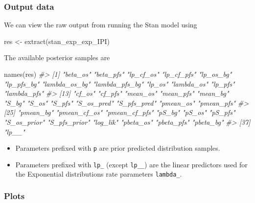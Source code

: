 \documentclass[
]{article}
\newenvironment{Shaded}{\begin{snugshade}}{\end{snugshade}}
\newcommand{\CommentTok}[1]{\textcolor[rgb]{0.56,0.35,0.01}{\textit{#1}}}
\newcommand{\FunctionTok}[1]{\textcolor[rgb]{0.00,0.00,0.00}{#1}}
\newcommand{\NormalTok}[1]{#1}
\newcommand{\OtherTok}[1]{\textcolor[rgb]{0.56,0.35,0.01}{#1}}
\providecommand{\tightlist}{%
  \setlength{\itemsep}{0pt}\setlength{\parskip}{0pt}}
\begin{document}
\hypertarget{output-data}{%
\subsubsection{Output data}\label{output-data}}

We can view the raw output from running the Stan model using

\begin{Shaded}
\begin{Highlighting}[]
\NormalTok{res }\OtherTok{\textless{}{-}} \FunctionTok{extract}\NormalTok{(stan\_exp\_exp\_IPI)}
\end{Highlighting}
\end{Shaded}

The available posterior samples are

\begin{Shaded}
\begin{Highlighting}[]
\FunctionTok{names}\NormalTok{(res)}
\CommentTok{\#\textgreater{}  [1] "beta\_os"       "beta\_pfs"      "lp\_cf\_os"      "lp\_cf\_pfs"     "lp\_os\_bg"      "lp\_pfs\_bg"     "lambda\_os\_bg"  "lambda\_pfs\_bg" "lp\_os"         "lambda\_os"     "lp\_pfs"        "lambda\_pfs"   }
\CommentTok{\#\textgreater{} [13] "cf\_os"         "cf\_pfs"        "mean\_os"       "mean\_pfs"      "mean\_bg"       "S\_bg"          "S\_os"          "S\_pfs"         "S\_os\_pred"     "S\_pfs\_pred"    "pmean\_os"      "pmean\_pfs"    }
\CommentTok{\#\textgreater{} [25] "pmean\_bg"      "pmean\_cf\_os"   "pmean\_cf\_pfs"  "pS\_bg"         "pS\_os"         "pS\_pfs"        "S\_os\_prior"    "S\_pfs\_prior"   "log\_lik"       "pbeta\_os"      "pbeta\_pfs"     "pbeta\_bg"     }
\CommentTok{\#\textgreater{} [37] "lp\_\_"}
\end{Highlighting}
\end{Shaded}

\begin{itemize}
\tightlist
\item
  Parameters prefixed with \texttt{p} are prior predicted distribution
  samples.
\item
  Parameters prefixed with \texttt{lp\_} (except \texttt{lp\_\_}) are
  the linear predictors used for the Exponential distributions rate
  parameters \texttt{lambda\_}.
\end{itemize}

\hypertarget{plots}{%
\subsubsection{Plots}\label{plots}}
\end{document}
